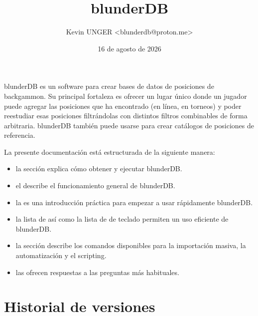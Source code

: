 \documentclass[letterpaper,10pt,spanish]{sphinxmanual}
\title{blunderDB}
\date{16 de agosto de 2026}
\author{Kevin UNGER <blunderdb@proton.me>}
\begin{document}
\pagestyle{empty}
\sphinxmaketitle
\pagestyle{plain}
\sphinxtableofcontents
\pagestyle{normal}
\label{\detokenize{index::doc}}


\sphinxAtStartPar
blunderDB es un software para crear bases de datos de posiciones de backgammon. Su principal fortaleza es ofrecer un lugar único donde un jugador puede agregar las posiciones que ha encontrado (en línea, en torneos) y poder reestudiar esas posiciones filtrándolas con distintos filtros combinables de forma arbitraria. blunderDB también puede usarse para crear catálogos de posiciones de referencia.

\sphinxAtStartPar
La presente documentación está estructurada de la siguiente manera:
\begin{itemize}
\item {} 
\sphinxAtStartPar
la sección  explica cómo obtener y ejecutar blunderDB.

\item {} 
\sphinxAtStartPar
el  describe el funcionamiento general de blunderDB.

\item {} 
\sphinxAtStartPar
la  es una introducción práctica para empezar a usar rápidamente blunderDB.

\item {} 
\sphinxAtStartPar
la lista de  así como la lista de  de teclado permiten un uso eficiente de blunderDB.

\item {} 
\sphinxAtStartPar
la sección  describe los comandos disponibles para la importación masiva, la automatización y el scripting.

\item {} 
\sphinxAtStartPar
las  ofrecen respuestas a las preguntas más habituales.

\end{itemize}


\chapter{Historial de versiones}
\label{\detokenize{index:historique-des-versions}}
\end{document}
